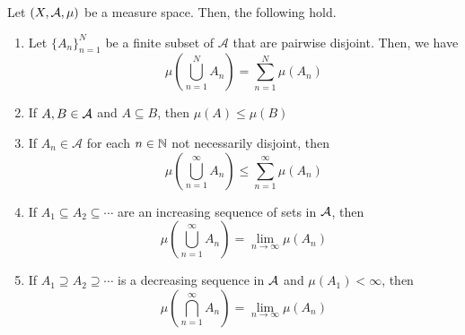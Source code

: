 \begin{lemma}
    Let $(X, \cal{A}, \mu)$ be a measure space. Then, the following hold.
    \begin{enumerate}
        \item Let $\{A_n\}_{n = 1}^{N}$ be a finite subset of $\mathcal{A}$ that are pairwise disjoint. Then, we have
        \[ \mu\left(\bigcup_{n = 1}^{N} A_{n}\right) = \sum_{n = 1}^{N} \mu(A_n) \]
        \item If $A, B \in \cal{A}$ and $A \subseteq B$, then $\mu(A) \leq \mu(B)$
        \item If $A_n \in \mathcal{A}$ for each $n \in \N$ not necessarily disjoint, then
        \[ \mu\left(\bigcup_{n = 1}^{\infty} A_n\right) \leq \sum_{n = 1}^{\infty} \mu(A_n) \]
        \item If $A_{1} \subseteq A_2 \subseteq \cdots$ are an increasing sequence of sets in $\cal{A}$, then
        \[ \mu\left(\bigcup_{n = 1}^{\infty} A_n\right) = \lim_{n \to \infty} \mu(A_n) \]
        \item If $A_1 \supseteq A_2 \supseteq \cdots$ is a decreasing sequence in $\cal{A}$ and $\mu(A_1) < \infty$, then
        \[ \mu\left(\bigcap_{n = 1}^{\infty} A_n\right) = \lim_{n \to \infty} \mu(A_n) \]
    \end{enumerate}
\end{lemma}
